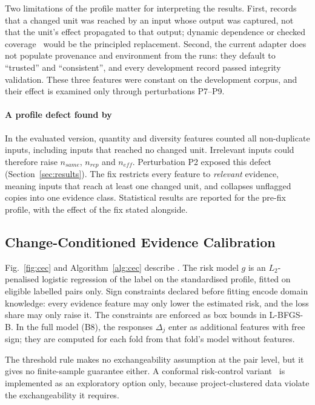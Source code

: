 Two limitations of the profile matter for interpreting the results. First,  records that a changed unit was reached by an input whose output was captured, not that the unit's effect propagated to that output; dynamic dependence or checked coverage~\cite{schuler2011assessing} would be the principled replacement. Second, the current adapter does not populate provenance and environment from the runs: they default to ``trusted'' and ``consistent'', and every development record passed integrity validation. These three features were constant on the development corpus, and their effect is examined only through perturbations P7--P9.

\paragraph*{A profile defect found by \ers{}} In the evaluated version, quantity and diversity features counted all non-duplicate inputs, including inputs that reached no changed unit. Irrelevant inputs could therefore raise $n_{\mathit{same}}$, $n_{\mathit{rep}}$ and $n_{\mathit{eff}}$. Perturbation P2 exposed this defect (Section~\ref{sec:results}). The fix restricts every feature to \emph{relevant} evidence, meaning inputs that reach at least one changed unit, and collapses unflagged copies into one evidence class. Statistical results are reported for the pre-fix profile, with the effect of the fix stated alongside.

\subsection{Change-Conditioned Evidence Calibration}
Fig.~\ref{fig:cec} and Algorithm~\ref{alg:cec} describe \cec{}. The risk model $g$ is an $L_2$-penalised logistic regression of the label on the standardised profile, fitted on eligible labelled pairs only. Sign constraints declared before fitting encode domain knowledge: every evidence feature may only lower the estimated risk, and the loss share may only raise it. The constraints are enforced as box bounds in L-BFGS-B. In the full model (B8), the \ers{} responses $\Delta_j$ enter as additional features with free sign; they are computed for each fold from that fold's model without \ers{} features.

The threshold rule makes no exchangeability assumption at the pair level, but it gives no finite-sample guarantee either. A conformal risk-control variant~\cite{angelopoulos2024conformal} is implemented as an exploratory option only, because project-clustered data violate the exchangeability it requires.

